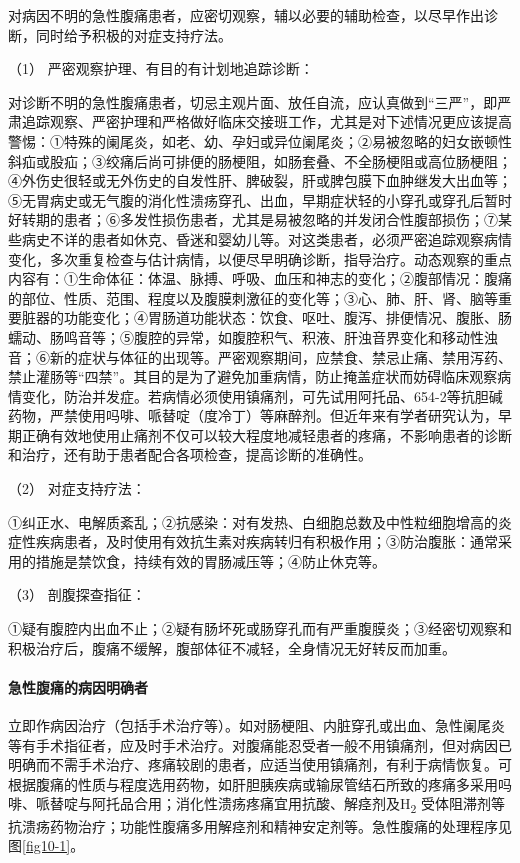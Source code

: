 对病因不明的急性腹痛患者，应密切观察，辅以必要的辅助检查，以尽早作出诊断，同时给予积极的对症支持疗法。

\hypertarget{text00026.htmlux5cux23CHP1-10-3-1-2-1}{}
（1） 严密观察护理、有目的有计划地追踪诊断：

对诊断不明的急性腹痛患者，切忌主观片面、放任自流，应认真做到“三严”，即严肃追踪观察、严密护理和严格做好临床交接班工作，尤其是对下述情况更应该提高警惕：①特殊的阑尾炎，如老、幼、孕妇或异位阑尾炎；②易被忽略的妇女嵌顿性斜疝或股疝；③绞痛后尚可排便的肠梗阻，如肠套叠、不全肠梗阻或高位肠梗阻；④外伤史很轻或无外伤史的自发性肝、脾破裂，肝或脾包膜下血肿继发大出血等；⑤无胃病史或无气腹的消化性溃疡穿孔、出血，早期症状轻的小穿孔或穿孔后暂时好转期的患者；⑥多发性损伤患者，尤其是易被忽略的并发闭合性腹部损伤；⑦某些病史不详的患者如休克、昏迷和婴幼儿等。对这类患者，必须严密追踪观察病情变化，多次重复检查与估计病情，以便尽早明确诊断，指导治疗。动态观察的重点内容有：①生命体征：体温、脉搏、呼吸、血压和神志的变化；②腹部情况：腹痛的部位、性质、范围、程度以及腹膜刺激征的变化等；③心、肺、肝、肾、脑等重要脏器的功能变化；④胃肠道功能状态：饮食、呕吐、腹泻、排便情况、腹胀、肠蠕动、肠鸣音等；⑤腹腔的异常，如腹腔积气、积液、肝浊音界变化和移动性浊音；⑥新的症状与体征的出现等。严密观察期间，应禁食、禁忌止痛、禁用泻药、禁止灌肠等“四禁”。其目的是为了避免加重病情，防止掩盖症状而妨碍临床观察病情变化，防治并发症。若病情必须使用镇痛剂，可先试用阿托品、654-2等抗胆碱药物，严禁使用吗啡、哌替啶（度冷丁）等麻醉剂。但近年来有学者研究认为，早期正确有效地使用止痛剂不仅可以较大程度地减轻患者的疼痛，不影响患者的诊断和治疗，还有助于患者配合各项检查，提高诊断的准确性。

\hypertarget{text00026.htmlux5cux23CHP1-10-3-1-2-2}{}
（2） 对症支持疗法：

①纠正水、电解质紊乱；②抗感染：对有发热、白细胞总数及中性粒细胞增高的炎症性疾病患者，及时使用有效抗生素对疾病转归有积极作用；③防治腹胀：通常采用的措施是禁饮食，持续有效的胃肠减压等；④防止休克等。

\hypertarget{text00026.htmlux5cux23CHP1-10-3-1-2-3}{}
（3） 剖腹探查指征：

①疑有腹腔内出血不止；②疑有肠坏死或肠穿孔而有严重腹膜炎；③经密切观察和积极治疗后，腹痛不缓解，腹部体征不减轻，全身情况无好转反而加重。

\paragraph{急性腹痛的病因明确者}

立即作病因治疗（包括手术治疗等）。如对肠梗阻、内脏穿孔或出血、急性阑尾炎等有手术指征者，应及时手术治疗。对腹痛能忍受者一般不用镇痛剂，但对病因已明确而不需手术治疗、疼痛较剧的患者，应适当使用镇痛剂，有利于病情恢复。可根据腹痛的性质与程度选用药物，如肝胆胰疾病或输尿管结石所致的疼痛多采用吗啡、哌替啶与阿托品合用；消化性溃疡疼痛宜用抗酸、解痉剂及H\textsubscript{2}
受体阻滞剂等抗溃疡药物治疗；功能性腹痛多用解痉剂和精神安定剂等。急性腹痛的处理程序见图\ref{fig10-1}。


